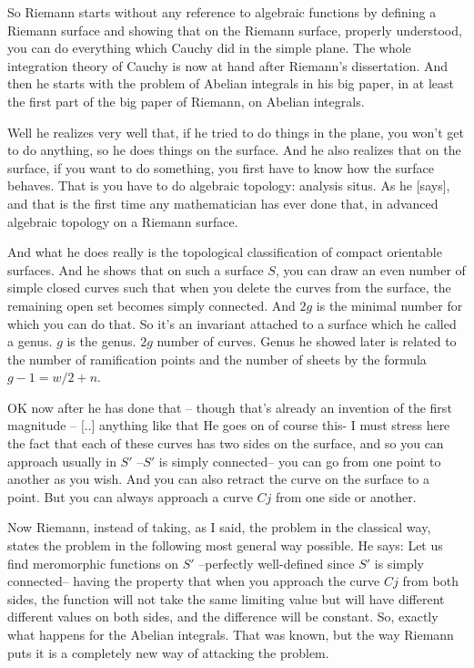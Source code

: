 \documentclass{article}
\begin{document}
So Riemann starts 
without any reference to algebraic functions
by defining a Riemann surface 
and showing that on the Riemann surface, 
properly understood,
you can do everything which Cauchy did 
in the simple plane.
The whole integration theory of Cauchy 
is now at hand after Riemann's dissertation.
And then he starts with the problem 
of Abelian integrals in his big paper,
in at least the first part of the big paper of Riemann, 
on Abelian integrals.

Well he realizes very well that, 
if he tried to do things in the plane,
you won't get to do anything, 
so he does things on the surface.
And he also realizes that on the surface, 
if you want to do something,
you first have to know how the surface behaves.
That is you have to do algebraic topology: 
analysis situs.
As he [says], 
and that is the first time any mathematician has ever done that,
in advanced algebraic topology on a Riemann surface.

And what he does really 
is the topological classification 
of compact orientable surfaces.
And he shows that on such a surface $S$,
you can draw an even number of simple closed curves
such that when you delete the curves from the surface,
the remaining open set becomes simply connected.
And $2g$ is the minimal number for which you can do that.
So it's an invariant attached to a surface 
which he called a genus.
$g$ is the genus.
$2g$ number of curves.
Genus he showed later is related to the number of ramification points
and the number of sheets by the formula $g-1=w/2 +n$.

OK now after he has done that 
-- though that's already an invention 
of the first magnitude -- 
[..] anything like that
He goes on of course this- 
I must stress here the fact that each of these curves 
has two sides on the surface,
and so you can approach usually in $S'$
--$S'$ is simply connected-- 
you can go from one point to another as you wish. 
And you can also retract the curve on the surface to a point.
But you can always approach a curve $Cj$ from one side or another.

Now Riemann, instead of taking, as I said, 
the problem in the classical way,
states the problem in the following most general way possible.
He says: Let us find meromorphic functions on $S'$
--perfectly well-defined since $S'$ is simply connected--
having the property 
that when you approach the curve $Cj$ from both sides,
the function will not take the same limiting value 
but will have different different values on both sides,
and the difference will be constant.
So, exactly what happens for the Abelian integrals. 
That was known, but the way Riemann puts it 
is a completely new way of attacking the problem.
\end{document}
